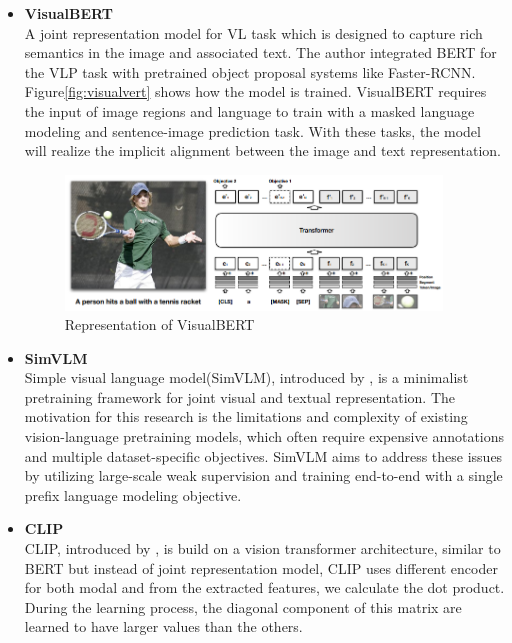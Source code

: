 
\begin{itemize}
    \item \textbf{VisualBERT}\\
    A joint representation model for VL task which is designed to capture rich semantics in the image and associated text. The author integrated BERT for the VLP task with pretrained object proposal systems like Faster-RCNN. Figure\ref{fig:visualvert} shows how the model is trained. VisualBERT requires the input of image regions and language to train with a masked language modeling and sentence-image prediction task. With these tasks, the model will realize the implicit alignment between the image and text representation.
    \begin{figure}[htbp]
        \begin{center}
            \includegraphics[width=10cm]{img/VisualBERT.png}
            \caption{Representation of VisualBERT}
        \end{center}
    \end{figure}

    \item \textbf{SimVLM}\\
    Simple visual language model(SimVLM), introduced by \cite{wang2022simvlm}, is a minimalist pretraining framework for joint visual and textual representation. The motivation for this research is the limitations and complexity of existing vision-language pretraining models, which often require expensive annotations and multiple dataset-specific objectives. SimVLM aims to address these issues by utilizing large-scale weak supervision and training end-to-end with a single prefix language modeling objective.


    \item \textbf{CLIP}\\
    CLIP, introduced by \cite{radford2021learning}, is build on a vision transformer architecture, similar to BERT but instead of joint representation model, CLIP uses different encoder for both modal and from the extracted features, we calculate the dot product. During the learning process, the diagonal component of this matrix are learned to have larger values than the others.
    
\end{itemize}


